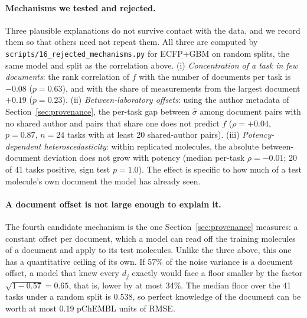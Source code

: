 \paragraph{Mechanisms we tested and rejected.} Three plausible explanations do not survive contact with the data, and we record them so that others need not repeat them. All three are computed by \texttt{scripts/}\allowbreak\texttt{16\_rejected\_mechanisms.py} for ECFP+GBM on random splits, the same model and split as the correlation above. (i) \emph{Concentration of a task in few documents}: the rank correlation of $f$ with the number of documents per task is $-0.08$ ($p=0.63$), and with the share of measurements from the largest document $+0.19$ ($p=0.23$). (ii) \emph{Between-laboratory offsets}: using the author metadata of Section~\ref{sec:provenance}, the per-task gap between $\hat\sigma$ among document pairs with no shared author and pairs that share one does not predict $f$ ($\rho=+0.04$, $p=0.87$, $n=24$ tasks with at least 20 shared-author pairs). (iii) \emph{Potency-dependent heteroscedasticity}: within replicated molecules, the absolute between-document deviation does not grow with potency (median per-task $\rho=-0.01$; 20 of 41 tasks positive, sign test $p=1.0$). The effect is specific to how much of a test molecule's own document the model has already seen.

\paragraph{A document offset is not large enough to explain it.} The fourth candidate mechanism is the one Section~\ref{sec:provenance} measures: a constant offset per document, which a model can read off the training molecules of a document and apply to its test molecules. Unlike the three above, this one has a quantitative ceiling of its own. If 57\% of the noise variance is a document offset, a model that knew every $d_j$ exactly would face a floor smaller by the factor $\sqrt{1-0.57}=0.65$, that is, lower by at most 34\%. The median floor over the 41 tasks under a random split is 0.538, so perfect knowledge of the document can be worth at most 0.19 pChEMBL units of RMSE.

